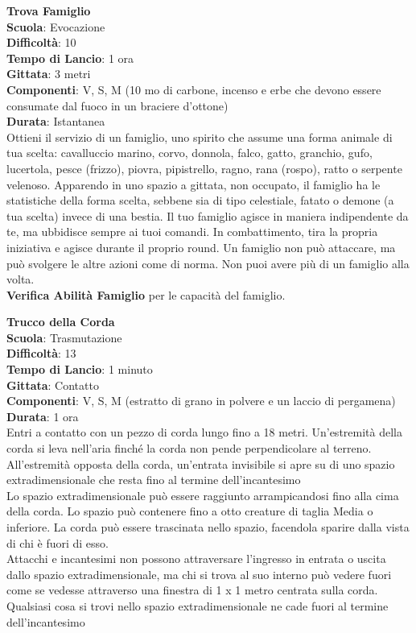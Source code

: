 \begin{multicols}{2}
\medskip\textbf{Trova Famiglio}\\
\textbf{Scuola}: Evocazione\\
\textbf{Difficoltà}: 10\\
\textbf{Tempo di Lancio}: 1 ora\\
\textbf{Gittata}: 3 metri\\
\textbf{Componenti}: V, S, M (10 mo di carbone, incenso e erbe che devono essere consumate dal fuoco in un braciere d'ottone)\\
\textbf{Durata}: Istantanea\\
Ottieni il servizio di un famiglio, uno spirito che assume una forma animale di tua scelta: cavalluccio marino, corvo, donnola, falco, gatto, granchio, gufo, lucertola, pesce (frizzo), piovra, pipistrello, ragno, rana (rospo), ratto o serpente velenoso. Apparendo in uno spazio a gittata, non occupato, il famiglio ha le statistiche della forma scelta, sebbene sia di tipo celestiale, fatato o demone (a tua scelta) invece di una bestia. Il tuo famiglio agisce in maniera indipendente da te, ma ubbidisce sempre ai tuoi comandi. In combattimento, tira la propria iniziativa e agisce durante il proprio round. Un famiglio non può attaccare, ma può svolgere le altre azioni come di norma. 
Non puoi avere più di un famiglio alla volta. \\
\textbf{Verifica Abilità Famiglio} per le capacità del famiglio.

\medskip\textbf{Trucco della Corda}\\
\textbf{Scuola}: Trasmutazione\\
\textbf{Difficoltà}: 13\\
\textbf{Tempo di Lancio}: 1 minuto\\
\textbf{Gittata}: Contatto\\
\textbf{Componenti}: V, S, M (estratto di grano in polvere e un laccio di pergamena)\\
\textbf{Durata}: 1 ora\\
Entri a contatto con un pezzo di corda lungo fino a 18 metri. Un'estremità della corda si leva nell'aria finché la corda non pende perpendicolare al terreno. All'estremità opposta della corda, un'entrata invisibile si apre su di uno spazio extradimensionale che resta fino al termine dell'incantesimo \\
Lo spazio extradimensionale può essere raggiunto arrampicandosi fino alla cima della corda. Lo spazio può contenere fino a otto creature di taglia Media o inferiore. La corda può essere trascinata nello spazio, facendola sparire dalla vista di chi è fuori di esso.\\
Attacchi e incantesimi non possono attraversare l'ingresso in entrata o uscita dallo spazio extradimensionale, ma chi si trova al suo interno può vedere fuori come se vedesse attraverso una finestra di 1 x 1 metro centrata sulla corda.\\
Qualsiasi cosa si trovi nello spazio extradimensionale ne cade fuori al termine dell'incantesimo


\end{multicols}
